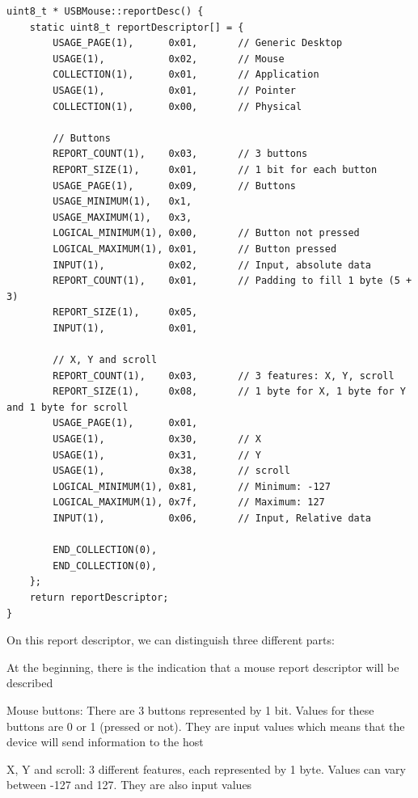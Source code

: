 \documentclass[pdftex,10pt,a4paper]{report}
\newenvironment{packed_item}{
\begin{itemize}
  \setlength{\itemsep}{1pt}
  \setlength{\parskip}{0pt}
  \setlength{\parsep}{0pt}
}{\end{itemize}}
\begin{document}
\begin{lstlisting}[label=Mouse Report Descriptor,caption=Mouse Report Descriptor]
uint8_t * USBMouse::reportDesc() {
    static uint8_t reportDescriptor[] = {
        USAGE_PAGE(1),      0x01,       // Generic Desktop
        USAGE(1),           0x02,       // Mouse
        COLLECTION(1),      0x01,       // Application
        USAGE(1),           0x01,       // Pointer
        COLLECTION(1),      0x00,       // Physical

        // Buttons
        REPORT_COUNT(1),    0x03,       // 3 buttons
        REPORT_SIZE(1),     0x01,       // 1 bit for each button
        USAGE_PAGE(1),      0x09,       // Buttons
        USAGE_MINIMUM(1),   0x1,    
        USAGE_MAXIMUM(1),   0x3,
        LOGICAL_MINIMUM(1), 0x00,       // Button not pressed
        LOGICAL_MAXIMUM(1), 0x01,       // Button pressed
        INPUT(1),           0x02,       // Input, absolute data
        REPORT_COUNT(1),    0x01,       // Padding to fill 1 byte (5 + 3)
        REPORT_SIZE(1),     0x05,
        INPUT(1),           0x01,
        
        // X, Y and scroll
        REPORT_COUNT(1),    0x03,       // 3 features: X, Y, scroll
        REPORT_SIZE(1),     0x08,       // 1 byte for X, 1 byte for Y and 1 byte for scroll
        USAGE_PAGE(1),      0x01,
        USAGE(1),           0x30,       // X
        USAGE(1),           0x31,       // Y
        USAGE(1),           0x38,       // scroll
        LOGICAL_MINIMUM(1), 0x81,       // Minimum: -127
        LOGICAL_MAXIMUM(1), 0x7f,       // Maximum: 127
        INPUT(1),           0x06,       // Input, Relative data

        END_COLLECTION(0),
        END_COLLECTION(0),
    };
    return reportDescriptor;
}
\end{lstlisting}

On this report descriptor, we can distinguish three different parts:
\begin{packed_item}
	\item At the beginning, there is the indication that a mouse report descriptor will be described
	\item Mouse buttons: There are 3 buttons represented by 1 bit. Values for these buttons are 0 or 1 (pressed or not). They are input values which means that the device will send information to the host
	\item X, Y and scroll: 3 different features, each represented by 1 byte. Values can vary between -127 and 127. They are also input values
\end{packed_item}
\end{document}
